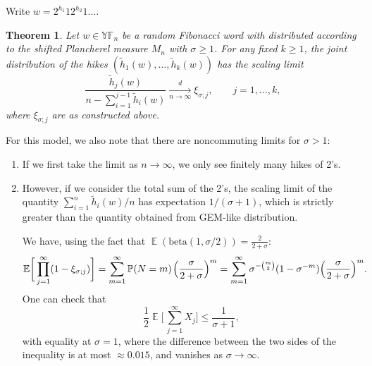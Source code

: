 \documentclass[letterpaper,11pt,oneside,reqno]{article}
\numberwithin{equation}{section}
\newcommand{\ssp}{\hspace{1pt}}
\newtheorem{theorem}[proposition]{Theorem}
\theoremstyle{definition}
\begin{document}
Write $w=2^{h_1}12^{h_2}1\ldots $.

\begin{theorem}
	Let $w\in \mathbb{YF}_n$ be a random Fibonacci word with distributed
	according to the shifted Plancherel measure $M_n$ with $\sigma\ge1$.
	For any fixed $k\ge 1$, the joint distribution of the
	hikes $(\tilde h_1(w), \ldots, \tilde h_k(w))$ has the scaling limit
	\begin{equation*}
		\frac{\tilde h_j(w)}{n-\sum_{i=1}^{j-1}\tilde h_i(w)}\xrightarrow[n\to\infty]{d}\xi_{\sigma;j},\qquad j=1,\ldots,k,
	\end{equation*}
	where $\xi_{\sigma;j}$ are as constructed above.
\end{theorem}


For this model, we also note that there are noncommuting limits for $\sigma>1$:
\begin{enumerate}
	\item If we first take the limit as $n\to \infty$, we only see finitely
		many hikes of 2's.
	\item However, if we consider the total sum of the 2's, the scaling limit of the
		quantity $\sum_{i=1}^n \tilde h_i(w)/n$ has expectation $1/(\sigma+1)$,
		which is strictly greater than the quantity obtained from GEM-like distribution. 

	We have, using the fact that
	$\operatorname{\mathbb{E}}(\mathrm{beta}(1,\sigma/2))=\frac{2}{2+\sigma}$:
	\begin{equation*}
		\operatorname{\mathbb{E}}\biggl[\,
		\prod_{j=1}^{\infty}(1-\xi_{\sigma;j})
		\biggr]
		=
		\sum_{m=1}^{\infty}
		\operatorname{\mathbb{P}}(N=m)\ssp
		\Bigl( \frac{\sigma}{2+\sigma} \Bigr)^m
		=
		\sum_{m=1}^{\infty}
		\sigma^{-\binom m2}(1-\sigma^{-m})
		\Bigl( \frac{\sigma}{2+\sigma} \Bigr)^m.
	\end{equation*}
	One can check that
	\begin{equation}
		\label{eq:expectation_to_compare}
		\frac{1}{2}\operatorname{\mathbb{E}}\biggl[\,\sum_{j=1}^{\infty}X_j\biggr]
		\le \frac{1}{\sigma+1},
	\end{equation}
	with equality at $\sigma=1$,
	where the difference between the two sides of the inequality
	is at most $\approx 0.015$, and vanishes as $\sigma\to\infty$.
\end{enumerate}




\end{document}
